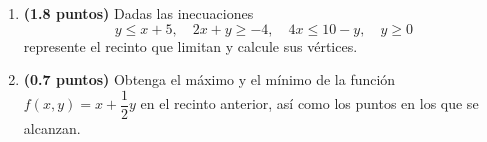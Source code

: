 
\begin{enumerate}[label=\alph*)]
\item \textbf{(1.8 puntos)} Dadas las inecuaciones
\[
y\leq x+5,\quad2x+y\geq-4,\quad4x\leq10-y,\quad y\geq0
\]
represente el recinto que limitan y calcule sus vértices.
\item \textbf{(0.7 puntos)} Obtenga el máximo y el mínimo de la función $f(x,y)=x+\dfrac{1}{2}y$ en el recinto anterior, así como los puntos en los que se alcanzan.
\end{enumerate}
